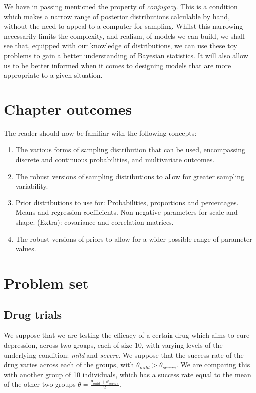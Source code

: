 \documentclass[11pt,fullpage]{book}
\begin{document}
We have in passing mentioned the property of \textit{conjugacy}. This is a condition which makes a narrow range of posterior distributions calculable by hand, without the need to appeal to a computer for sampling. Whilst this narrowing necessarily limits the complexity, and realism, of models we can build, we shall see that, equipped with our knowledge of distributions, we can use these toy problems to gain a better understanding of Bayesian statistics. It will also allow us to be better informed when it comes to designing models that are more appropriate to a given situation.

\section{Chapter outcomes}
The reader should now be familiar with the following concepts:

\begin{enumerate}
\item The various forms of sampling distribution that can be used, encompassing discrete and continuous probabilities, and multivariate outcomes.
\item The robust versions of sampling distributions to allow for greater sampling variability.
\item Prior distributions to use for: 
\subitem Probabilities, proportions and percentages.
\subitem Means and regression coefficients.
\subitem Non-negative parameters for scale and shape.
\subitem (Extra): covariance and correlation matrices.
\item The robust versions of priors to allow for a wider possible range of parameter values.
\end{enumerate}

\section{Problem set}
\subsection{Drug trials}
We suppose that we are testing the efficacy of a certain drug which aims to cure depression, across two groups, each of size 10, with varying levels of the underlying condition: \textit{mild} and \textit{severe}. We suppose that the success rate of the drug varies across each of the groups, with $\theta_{mild}>\theta_{severe}$. We are comparing this with another group of 10 individuals, which has a success rate equal to the mean of the other two groups $\theta = \frac{\theta_{mild}+\theta_{severe}}{2}$.
\end{document}
